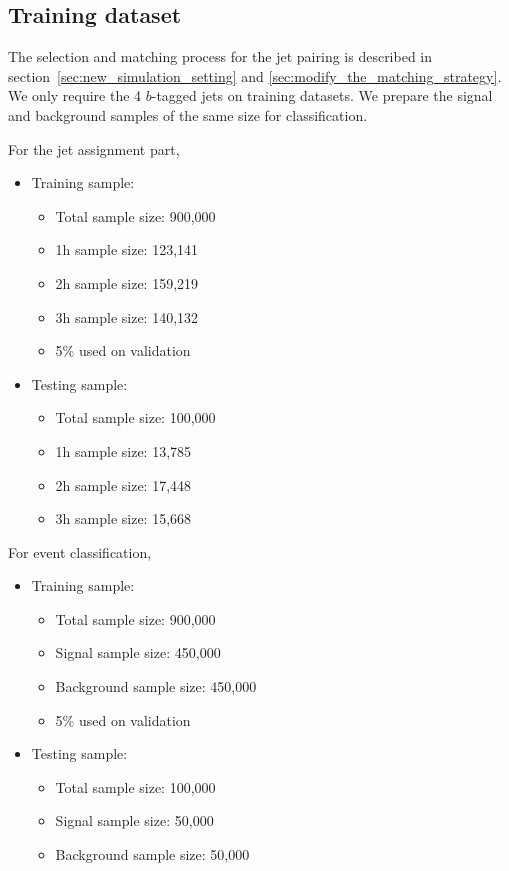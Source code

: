 \documentclass[12pt]{article}
\begin{document}
    \subsection{Training dataset}%
    \label{sub:training_dataset_spanet_classifier}
    The selection and matching process for the jet pairing is described in section~\ref{sec:new_simulation_setting} and \ref{sec:modify_the_matching_strategy}. We only require the 4 $b$-tagged jets on training datasets. We prepare the signal and background samples of the same size for classification.

        For the jet assignment part,
        \begin{itemize}
            \item Training sample:
            \begin{itemize}
                \item Total sample size: 900,000
                \item 1h sample size: 123,141
                \item 2h sample size: 159,219
                \item 3h sample size: 140,132
                \item 5\% used on validation
            \end{itemize}
            \item Testing sample:
            \begin{itemize}
                \item Total sample size: 100,000
                \item 1h sample size: 13,785
                \item 2h sample size: 17,448
                \item 3h sample size: 15,668
            \end{itemize}
        \end{itemize}

        For event classification,
        \begin{itemize}
            \item Training sample:
            \begin{itemize}
                \item Total sample size: 900,000
                \item Signal sample size: 450,000
                \item Background sample size: 450,000
                \item 5\% used on validation
            \end{itemize}
            \item Testing sample:
            \begin{itemize}
                \item Total sample size: 100,000
                \item Signal sample size: 50,000
                \item Background sample size: 50,000
            \end{itemize}
        \end{itemize}
\end{document}

